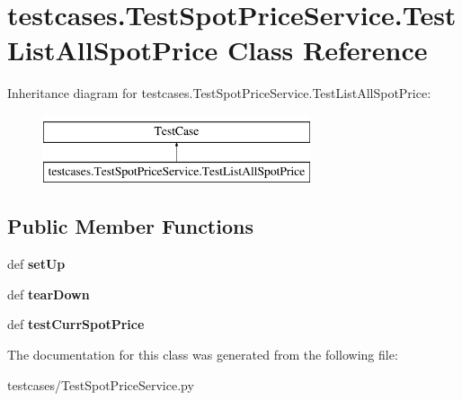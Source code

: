\hypertarget{classtestcases_1_1TestSpotPriceService_1_1TestListAllSpotPrice}{\section{testcases.\-Test\-Spot\-Price\-Service.\-Test\-List\-All\-Spot\-Price Class Reference}
\label{classtestcases_1_1TestSpotPriceService_1_1TestListAllSpotPrice}
}
Inheritance diagram for testcases.\-Test\-Spot\-Price\-Service.\-Test\-List\-All\-Spot\-Price\-:\begin{figure}[H]
\begin{center}
\leavevmode
\includegraphics[height=2.000000cm]{classtestcases_1_1TestSpotPriceService_1_1TestListAllSpotPrice}
\end{center}
\end{figure}
\subsection*{Public Member Functions}
\begin{DoxyCompactItemize}
\item 
\hypertarget{classtestcases_1_1TestSpotPriceService_1_1TestListAllSpotPrice_a60938a032afc281dbd7fcd92731f405d}{def {\bfseries set\-Up}}\label{classtestcases_1_1TestSpotPriceService_1_1TestListAllSpotPrice_a60938a032afc281dbd7fcd92731f405d}

\item 
\hypertarget{classtestcases_1_1TestSpotPriceService_1_1TestListAllSpotPrice_a5050f360ed8ca959d187c9d036d47f7b}{def {\bfseries tear\-Down}}\label{classtestcases_1_1TestSpotPriceService_1_1TestListAllSpotPrice_a5050f360ed8ca959d187c9d036d47f7b}

\item 
\hypertarget{classtestcases_1_1TestSpotPriceService_1_1TestListAllSpotPrice_ae1f6d7bd97c17684106181f011923c9e}{def {\bfseries test\-Curr\-Spot\-Price}}\label{classtestcases_1_1TestSpotPriceService_1_1TestListAllSpotPrice_ae1f6d7bd97c17684106181f011923c9e}

\end{DoxyCompactItemize}


The documentation for this class was generated from the following file\-:\begin{DoxyCompactItemize}
\item 
testcases/Test\-Spot\-Price\-Service.\-py\end{DoxyCompactItemize}
